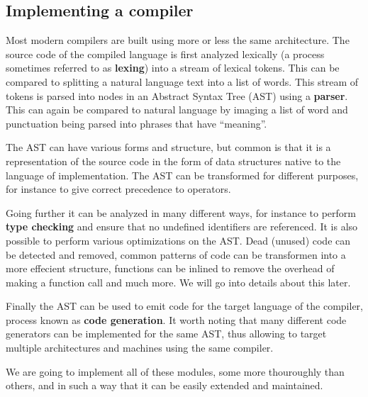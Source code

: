 \subsection{Implementing a compiler}

Most modern compilers are built using more or less the same architecture. The source code of the compiled language is first analyzed lexically (a process sometimes referred to as \textbf{lexing}) into a stream of lexical tokens. This can be compared to splitting a natural language text into a list of words. This stream of tokens is parsed into nodes in an Abstract Syntax Tree (AST) using a \textbf{parser}. This can again be compared to natural language by imaging a list of word and punctuation being parsed into phrases that have ``meaning''.

The AST can have various forms and structure, but common is that it is a representation of the source code in the form of data structures native to the language of implementation. The AST can be transformed for different purposes, for instance to give correct precedence to operators.

Going further it can be analyzed in many different ways, for instance to perform \textbf{type checking} and ensure that no undefined identifiers are referenced. It is also possible to perform various optimizations on the AST. Dead (unused) code can be detected and removed, common patterns of code can be transformen into a more effecient structure, functions can be inlined to remove the overhead of making a function call and much more. We will go into details about this later.

Finally the AST can be used to emit code for the target language of the compiler, process known as \textbf{code generation}. It worth noting that many different code generators can be implemented for the same AST, thus allowing to target multiple architectures and machines using the same compiler.

We are going to implement all of these modules, some more thouroughly than others, and in such a way that it can be easily extended and maintained.


